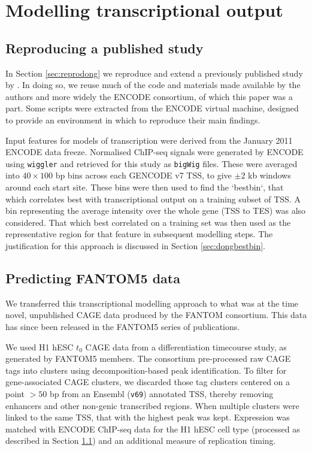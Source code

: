 \documentclass[a4paper,11pt,oneside]{book}
\begin{document}
\section{Modelling transcriptional output}

\subsection{Reproducing a published study}\label{meth:dong}
In Section \ref{sec:reprodong} we reproduce and extend a previously published study by \citet{Dong2012}. In doing so, we reuse much of the code and materials made available by the authors and more widely the ENCODE consortium\cite{Dunham2012}, of which this paper was a part. Some scripts were extracted from the ENCODE virtual machine, designed to provide an environment in which to reproduce their main findings.\cite{Myers2011}

Input features for models of transcription were derived from the January 2011 ENCODE data freeze.\cite{Dunham2012} Normalised ChIP-seq signals were generated by ENCODE using \texttt{wiggler} and retrieved for this study as \texttt{bigWig} files. These were averaged into $40 \times 100$ bp bins across each GENCODE v7 TSS, to give $\pm 2$ kb windows around each start site. These bins were then used to find the `bestbin`, that which correlates best with transcriptional output on a training subset of TSS. A bin representing the average intensity over the whole gene (TSS to TES) was also considered. That which best correlated on a training set was then used as the representative region for that feature in subsequent modelling steps.\cite{Dong2012} The justification for this approach is discussed in Section \ref{sec:dongbestbin}.

\subsection{Predicting FANTOM5 data}\label{meth:fantom5}

We transferred this transcriptional modelling approach to what was at the time novel, unpublished CAGE data produced by the FANTOM consortium. This data has since been released in the FANTOM5 series of publications.\cite{fantom5}

We used H1 hESC $t_0$ CAGE data from a differentiation timecourse study, as generated by FANTOM5 members. The consortium pre-processed raw CAGE tags into clusters using decomposition-based peak identification.\cite{fantom5} To filter for gene-associated CAGE clusters, we discarded those tag clusters centered on a point $>50$ bp from an Ensembl (\texttt{v69}) annotated TSS, thereby removing enhancers and other non-genic transcribed regions. When multiple clusters were linked to the same TSS, that with the highest peak was kept. Expression was matched with ENCODE ChIP-seq data for the H1 hESC cell type (processed as described in Section \ref{meth:dong}) and an additional measure of replication timing. 
\end{document}
